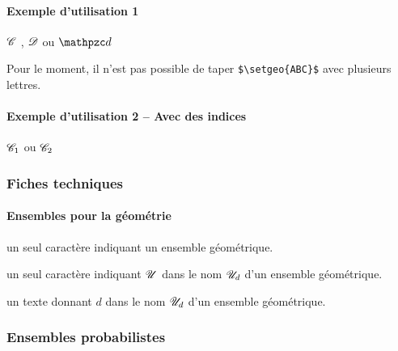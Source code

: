 \documentclass[12pt,a4paper]{article}
\begin{document}
\paragraph{Exemple d'utilisation 1}

\begin{latexex}
$\setgeo{C}$ ,
$\setgeo{D}$ ou
$\setgeo{d}$
\end{latexex}

\begin{remark}
	Pour le moment, il n'est pas possible de taper \verb+$\setgeo{ABC}$+ avec plusieurs lettres.
\end{remark}




\paragraph{Exemple d'utilisation 2 -- Avec des indices}

\begin{latexex}
$\setgeo*{C}{1}$ ou
$\setgeo*{C}{2}$
\end{latexex}




\subsubsection{Fiches techniques}

\paragraph{Ensembles pour la géométrie}


\IDarg{} un seul caractère \ascii{} indiquant un ensemble géométrique.


\separation



 un seul caractère \ascii{} indiquant $\setgeo{U}$ dans le nom $\setgeo*{U}{d}$ d'un ensemble géométrique.

 un texte donnant $d$ dans le nom $\setgeo*{U}{d}$ d'un ensemble géométrique.




\subsubsection{Ensembles probabilistes}
\end{document}
